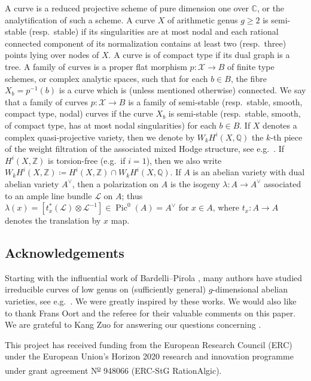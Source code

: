 \documentclass[a4paper,11pt,reqno]{amsart}
\numberwithin{equation}{section}
\theoremstyle{plain}
\theoremstyle{definition}
\newcommand{\Z}{\mathbb Z}
\newcommand{\Q}{\mathbb Q}
\newcommand{\C}{\mathbb C}
\newcommand{\Pic}{\operatorname{Pic}}
\newcommand{\ca}[1]{{\mathcal{#1}}}
\begin{document}
A curve is a reduced projective scheme of pure dimension one over $\C$, or the analytification of such a scheme. A curve $X$ of arithmetic genus $g \geq 2$ is semi-stable (resp.\ stable) if its singularities are at most nodal and each rational connected component of its normalization contains at least two (resp.\ three) points lying over nodes of $X$. A curve is of compact type if its dual graph is a tree. 
A family of curves is a proper flat morphism $p \colon \ca X \to B$ of finite type schemes, or complex analytic spaces, such that for each $b \in B$, the fibre $X_b = p^{-1}(b)$ is a curve which is (unless mentioned otherwise) connected. We say that a family of curves $p \colon \ca X \to B$ is a family of semi-stable (resp.\ stable, smooth, compact type, nodal) curves if the curve $X_b$ is semi-stable (resp.\ stable, smooth, of compact type, has at most nodal singularities) for each $b \in B$. 
If $X$ denotes a complex quasi-projective variety, then we denote by $W_kH^i(X,\Q)$ the $k$-th piece of the weight filtration of the associated mixed Hodge structure, see e.g.\ \cite{petersteenbrink}.
If $H^i(X,\Z)$ is torsion-free (e.g.\ if $i=1$), then we also write $W_kH^i(X,\Z) \coloneqq H^i(X,\Z)\cap W_kH^i(X,\Q)$.
If $A$ is an abelian variety with dual abelian variety $A^\vee$, then a polarization on $A$ is the isogeny $\lambda \colon A \to A^\vee$ associated to an ample line bundle $\ca L$ on $A$; thus $\lambda(x) = [t_x^\ast(\ca L) \otimes \ca L^{-1}] \in \Pic^0(A) = A^\vee$ for $x \in A$, where $t_x \colon A \to A$ denotes the translation by $x$ map.

\subsection{Acknowledgements} 
Starting with the influential work of Bardelli--Pirola \cite{bardellipirola-curvesofgenusg}, many authors have studied irreducible curves of low genus on (sufficiently general) $g$-dimensional abelian varieties, see e.g.\ \cite{naranjopirola1994, lange-sernesi, marcucci-genusofcurves, marcucci-naranjo-pirola, naranjopirola2018}. 
We were greatly inspired by these works. 
We would also like to thank Frans Oort and the referee for their valuable comments on this paper. 
We are grateful to Kang Zuo for answering our questions concerning \cite{luzuo-shimuracurves}.  

This project has received funding from the European Research Council (ERC) under the European Union's Horizon 2020 research and innovation programme under grant agreement N\textsuperscript{\underline{o}} 948066  (ERC-StG RationAlgic).
 
\end{document}
